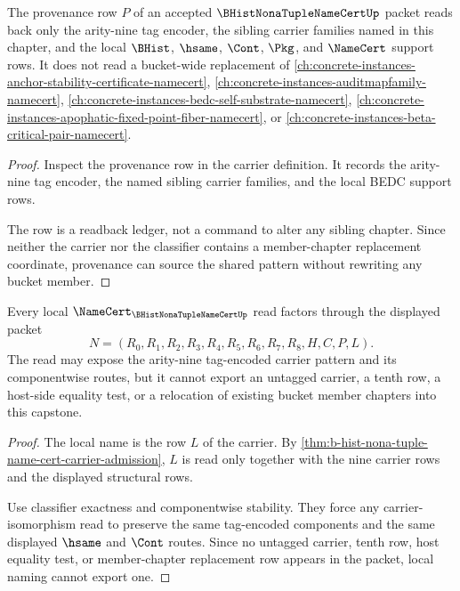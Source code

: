 \begin{theorem}
\label{thm:b-hist-nona-tuple-name-cert-provenance-readback}
The provenance row $P$ of an accepted $\BHistNonaTupleNameCertUp$ packet reads back only the arity-nine tag encoder, the sibling carrier families named in this chapter, and the local $\BHist$, $\hsame$, $\Cont$, $\Pkg$, and $\NameCert$ support rows. It does not read a bucket-wide replacement of \autoref{ch:concrete-instances-anchor-stability-certificate-namecert}, \autoref{ch:concrete-instances-auditmapfamily-namecert}, \autoref{ch:concrete-instances-bedc-self-substrate-namecert}, \autoref{ch:concrete-instances-apophatic-fixed-point-fiber-namecert}, or \autoref{ch:concrete-instances-beta-critical-pair-namecert}.
\end{theorem}
\begin{proof}
Inspect the provenance row in the carrier definition. It records the arity-nine tag encoder, the named sibling carrier families, and the local BEDC support rows.

The row is a readback ledger, not a command to alter any sibling chapter. Since neither the carrier nor the classifier contains a member-chapter replacement coordinate, provenance can source the shared pattern without rewriting any bucket member.
\end{proof}

\begin{theorem}
\label{thm:b-hist-nona-tuple-name-cert-local-naming-nonescape}
Every local $\NameCert_{\BHistNonaTupleNameCertUp}$ read factors through the displayed packet
$$
N=(R_0,R_1,R_2,R_3,R_4,R_5,R_6,R_7,R_8,H,C,P,L).
$$
The read may expose the arity-nine tag-encoded carrier pattern and its componentwise routes, but it cannot export an untagged carrier, a tenth row, a host-side equality test, or a relocation of existing bucket member chapters into this capstone.
\end{theorem}
\begin{proof}
The local name is the row $L$ of the carrier. By \autoref{thm:b-hist-nona-tuple-name-cert-carrier-admission}, $L$ is read only together with the nine carrier rows and the displayed structural rows.

Use classifier exactness and componentwise stability. They force any carrier-isomorphism read to preserve the same tag-encoded components and the same displayed $\hsame$ and $\Cont$ routes. Since no untagged carrier, tenth row, host equality test, or member-chapter replacement row appears in the packet, local naming cannot export one.
\end{proof}

